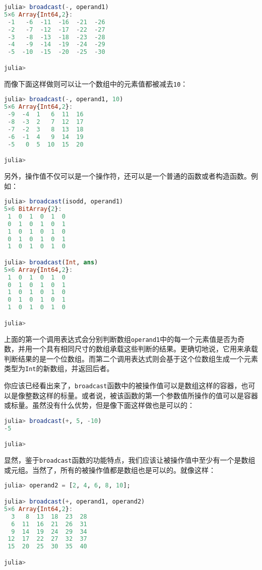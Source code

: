 \begin{lstlisting}[language=julia]
julia> broadcast(-, operand1)
5×6 Array{Int64,2}:
 -1   -6  -11  -16  -21  -26
 -2   -7  -12  -17  -22  -27
 -3   -8  -13  -18  -23  -28
 -4   -9  -14  -19  -24  -29
 -5  -10  -15  -20  -25  -30

julia> 
\end{lstlisting}

而像下面这样做则可以让一个数组中的元素值都被减去\verb`10`：

\begin{lstlisting}[language=julia]
julia> broadcast(-, operand1, 10)
5×6 Array{Int64,2}:
 -9  -4  1   6  11  16
 -8  -3  2   7  12  17
 -7  -2  3   8  13  18
 -6  -1  4   9  14  19
 -5   0  5  10  15  20

julia> 
\end{lstlisting}

另外，操作值不仅可以是一个操作符，还可以是一个普通的函数或者构造函数。例如：

\begin{lstlisting}[language=julia]
julia> broadcast(isodd, operand1)
5×6 BitArray{2}:
 1  0  1  0  1  0
 0  1  0  1  0  1
 1  0  1  0  1  0
 0  1  0  1  0  1
 1  0  1  0  1  0

julia> broadcast(Int, ans)
5×6 Array{Int64,2}:
 1  0  1  0  1  0
 0  1  0  1  0  1
 1  0  1  0  1  0
 0  1  0  1  0  1
 1  0  1  0  1  0

julia> 
\end{lstlisting}

上面的第一个调用表达式会分别判断数组\verb`operand1`中的每一个元素值是否为奇数，并用一个具有相同尺寸的数组承载这些判断的结果。更确切地说，它用来承载判断结果的是一个位数组。而第二个调用表达式则会基于这个位数组生成一个元素类型为\verb`Int`的新数组，并返回后者。

你应该已经看出来了，\verb`broadcast`函数中的被操作值可以是数组这样的容器，也可以是像整数这样的标量。或者说，被该函数的第一个参数值所操作的值可以是容器或标量。虽然没有什么优势，但是像下面这样做也是可以的：

\begin{lstlisting}[language=julia]
julia> broadcast(+, 5, -10)
-5

julia> 
\end{lstlisting}

显然，鉴于\verb`broadcast`函数的功能特点，我们应该让被操作值中至少有一个是数组或元组。当然了，所有的被操作值都是数组也是可以的。就像这样：

\begin{lstlisting}[language=julia]
julia> operand2 = [2, 4, 6, 8, 10];

julia> broadcast(+, operand1, operand2)
5×6 Array{Int64,2}:
  3   8  13  18  23  28
  6  11  16  21  26  31
  9  14  19  24  29  34
 12  17  22  27  32  37
 15  20  25  30  35  40

julia> 
\end{lstlisting}

